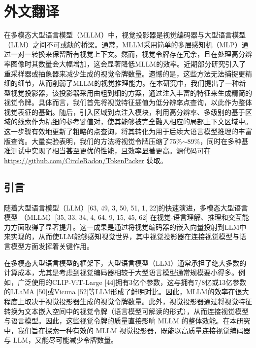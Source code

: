 \cleardoublepage

\newrefsection

\chapter{外文翻译}


在多模态大型语言模型（MLLM）中，视觉投影器是视觉编码器与大型语言模型（LLM）之间不可或缺的桥梁。通常，MLLM采用简单的多层感知机（MLP）通过一对一转换来保留所有视觉上下文。然而，视觉令牌存在冗余，且在处理高分辨率图像时其数量会大幅增加，这会显著降低MLLM的效率。近期部分研究引入了重采样器或抽象器来减少生成的视觉令牌数量。遗憾的是，这些方法无法捕捉更精细的细节，从而削弱了MLLM的视觉推理能力。在本研究中，我们提出了一种新型视觉投影器，该投影器采用由粗到细的方案，通过注入丰富的特征来生成精简的视觉令牌。具体而言，我们首先将视觉特征插值为低分辨率点查询，以此作为整体视觉表征的基础。随后，引入区域到点注入模块，利用高分辨率、多级别的基于区域的线索作为精细的参考键值对，使其能够被完全融入相应的局部上下文区域中。这一步骤有效地更新了粗略的点查询，将其转化为用于后续大语言模型推理的丰富版查询。大量实验表明，我们的方法将视觉令牌压缩了75\%$\sim$89\%，同时在多种基准测试中实现了相当甚至更优的性能，且效率显著更高。源代码可在 \url{https://github.com/CircleRadon/TokenPacker} 获取。

\section{引言}

随着大型语言模型（LLM）[63, 49, 3, 50, 51, 1, 22]的快速演进，多模态大型语言模型 （MLLM）[35, 33, 34, 4, 64, 9, 15, 45, 62] 在视觉-语言理解、推理和交互能力方面取得了显著提升。这一成果是通过将视觉编码器的嵌入向量投射到LLM中来实现的，从而使LLM能够感知视觉世界，其中视觉投影器在连接视觉模型与语言模型方面发挥着关键作用。

在多模态大型语言模型的框架下，大型语言模型（LLM）通常承担了绝大多数的计算成本，尤其是考虑到视觉编码器相较于大型语言模型通常规模要小得多。例如，广泛使用的CLIP-ViT-Large [44]拥有3亿个参数，这与拥有7/8亿或13亿参数的LLaMA [50]或Vicuna [52]等LLM形成了鲜明对比。因此，MLLM的效率在很大程度上取决于视觉投影器生成的视觉令牌数量。此外，视觉投影器通过将视觉特征转换为文本嵌入空间中的视觉令牌（语言模型可解读的形式），从而连接视觉模型与语言模型。因此，这些视觉令牌的质量直接影响 MLLM 的整体效能。在本研究中，我们旨在探索一种有效的 MLLM 视觉投影器，既能以高质量连接视觉编码器与 LLM，又能尽可能减少令牌数量。

